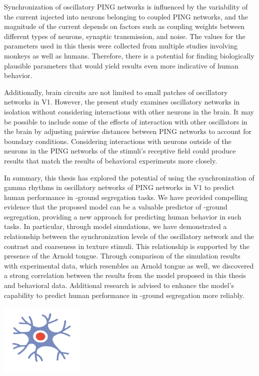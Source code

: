 Synchronization of oscillatory PING networks is influenced by the variability of the current injected into neurons belonging to coupled PING networks, and the magnitude of the current depends on factors such as coupling weights between different types of neurons, synaptic transmission, and noise. The values for the parameters used in this thesis were collected from multiple studies involving monkeys as well as humans. Therefore, there is a potential for finding biologically plausible parameters that would yield results even more indicative of human behavior.

Additionally, brain circuits are not limited to small patches of oscillatory networks in V1. However, the present study examines oscillatory networks in isolation without considering interactions with other neurons in the brain. It may be possible to include some of the effects of interaction with other oscillators in the brain by adjusting pairwise distances between PING networks to account for boundary conditions. Considering interactions with neurons outside of the neurons in the PING networks of the stimuli's receptive field could produce results that match the results of behavioral experiments more closely.

In summary, this thesis has explored the potential of using the synchronization of gamma rhythms in oscillatory networks of PING networks in V1 to predict human performance in \stimfig-ground segregation tasks. We have provided compelling evidence that the proposed model can be a valuable predictor of \stimfig-ground segregation, providing a new approach for predicting human behavior in such tasks. In particular, through model simulations, we have demonstrated a relationship between the synchronization levels of the oscillatory network and the contrast and coarseness in texture stimuli. This relationship is supported by the presence of the Arnold tongue. Through comparison of the simulation results with experimental data, which resembles an Arnold tongue as well, we discovered a strong correlation between the results from the model proposed in this thesis and behavioral data. Additional research is advised to enhance the model's capability to predict human performance in \stimfig-ground segregation more reliably.

\vfill
\vfill

\begin{center}
    \includegraphics[width=0.3\textwidth]{src/assets/images/neuron-illustrations/neuron-illustration3.pdf}
\end{center}

\vfill